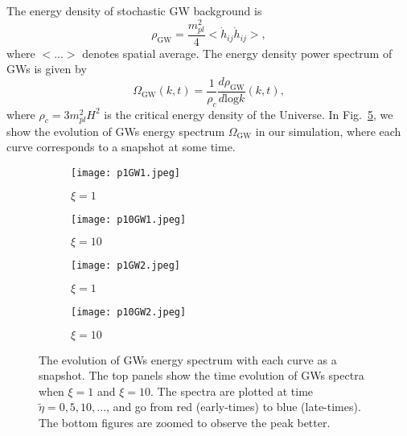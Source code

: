 \documentclass[12pt, a4paper]{article}
\begin{document}
The energy density of stochastic GW background is 
\begin{equation}
  \rho_{\text{GW}}=\frac{m_{pl}^2}{4}<\dot{h}_{ij}\dot{h}_{ij}>,
\end{equation}
where $<...>$ denotes spatial average. The energy density power spectrum of GWs is given by
\begin{equation}
  \Omega_{\text{GW}}\left(k,t\right)=\frac{1}{\rho_c}\frac{d\rho_{\text{GW}}}{d \text{log}k}\left(k,t\right),
\end{equation}
where $\rho_c=3m_{pl}^2H^2$ is the critical energy density of the Universe. In Fig.~\ref{fig:fig5}, we show the evolution of GWs energy spectrum $\Omega_{\text{GW}}$ in our simulation, where each curve corresponds to a snapshot at some time.
\begin{figure}[t]
  \centering
  \begin{subfigure}[b]{0.48\textwidth}
    \texttt{[image: p1GW1.jpeg]}
    \caption{$\xi=1$}
    \label{fig:fig5subfig1}
  \end{subfigure}
  \hfill
  \begin{subfigure}[b]{0.48\textwidth}
    \texttt{[image: p10GW1.jpeg]}
    \caption{$\xi=10$}
    \label{fig:fig5subfig2}
  \end{subfigure}

  \vspace{0.5cm}

  \begin{subfigure}[b]{0.48\textwidth}
    \texttt{[image: p1GW2.jpeg]}
    \caption{$\xi=1$}
    \label{fig:fig5subfig3}
  \end{subfigure}
  \hfill
  \begin{subfigure}[b]{0.48\textwidth}
    \texttt{[image: p10GW2.jpeg]}
    \caption{$\xi=10$}
    \label{fig:fig5subfig4}
  \end{subfigure}
  \caption{The evolution of GWs energy spectrum with each curve as a snapshot. The top panels show the time evolution 
  of GWs spectra when $\xi=1$ and $\xi=10$. The spectra are plotted at time $\tilde{\eta}=0, 5, 10,...$, and go from red (early-times) to blue (late-times).
  The bottom figures are zoomed to observe the peak better.} 
  \label{fig:fig5}
\end{figure}
\end{document}
